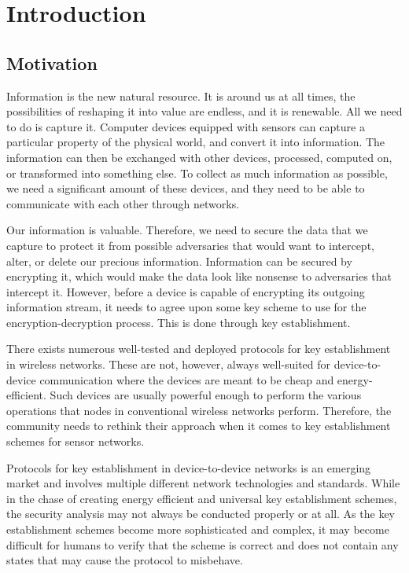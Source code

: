 \chapter{Introduction}
\label{chp:introduction} 


\section{Motivation}


Information is the new natural resource. It is around us at all times, the possibilities of reshaping it into value are endless, and it is renewable. All we need to do is capture it. Computer devices equipped with sensors can capture a particular property of the physical world, and convert it into information. The information can then be exchanged with other devices, processed, computed on, or transformed into something else. To collect as much information as possible, we need a significant amount of these devices, and they need to be able to communicate with each other through networks. 

Our information is valuable. Therefore, we need to secure the data that we capture to protect it from possible adversaries that would want to intercept, alter, or delete our precious information. Information can be secured by encrypting it, which would make the data look like nonsense to adversaries that intercept it. However, before a device is capable of encrypting its outgoing information stream, it needs to agree upon some key scheme to use for the encryption-decryption process. This is done through key establishment. 

There exists numerous well-tested and deployed protocols for key establishment in wireless networks. These are not, however, always well-suited for device-to-device communication where the devices are meant to be cheap and energy-efficient. Such devices are usually powerful enough to perform the various operations that nodes in conventional wireless networks perform. Therefore, the community needs to rethink their approach when it comes to key establishment schemes for sensor networks.

Protocols for key establishment in device-to-device networks is an emerging market and involves multiple different network technologies and standards. While in the chase of creating energy efficient and universal key establishment schemes, the security analysis may not always be conducted properly or at all. As the key establishment schemes become more sophisticated and complex, it may become difficult for humans to verify that the scheme is correct and does not contain any states that may cause the protocol to misbehave.


